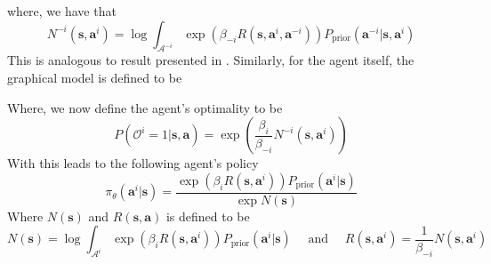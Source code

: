 where, we have that 
\begin{equation}
    N^{-i}(\boldsymbol{s}, \boldsymbol{a}^{i}) = \log \int_{\mathcal{A}^{-i}} \exp(\beta_{-i} R(\boldsymbol{s}, \boldsymbol{a}^i, \boldsymbol{a}^{-i})) P_{\text{prior}}(\boldsymbol{a}^{-i} | \boldsymbol{s}, \boldsymbol{a}^{i})
\end{equation}
This is analogous to result presented in \cite{wen2019probabilistic}. Similarly, for the agent itself, the graphical model is defined to be 
\begin{figure}[ht]
    \begin{minipage}[t]{0.5\linewidth}
    \centering
    \end{minipage}%
    \begin{minipage}[t]{0.5\linewidth}
    \end{minipage}
\end{figure}

\noindent
Where, we now define the agent's optimality to be 
\begin{equation}
    P(\mathcal{O}^i = 1 | \boldsymbol{s}, \boldsymbol{a}) = \exp\left( \frac{\beta_i}{\beta_{-i}} N^{-i}(\boldsymbol{s}, \boldsymbol{a}^{i}) \right) 
\end{equation}
With this leads to the following agent's policy 
\begin{equation}
    \pi_{\theta}(\boldsymbol{a}^{i} | \boldsymbol{s}) = \frac{\exp( \beta_i R(\boldsymbol{s}, \boldsymbol{a}^{i})) P_{\text{prior}}(\boldsymbol{a}^{i}  | \boldsymbol{s})}{\exp N(\boldsymbol{s})}
\end{equation}
Where $N(\boldsymbol{s})$ and $R(\boldsymbol{s}, \boldsymbol{a})$ is defined to be 
\begin{equation}
    N(\boldsymbol{s}) = \log \int_{\mathcal{A}^i} \exp( \beta_i R(\boldsymbol{s}, \boldsymbol{a}^{i})) P_{\text{prior}}(\boldsymbol{a}^{i}  | \boldsymbol{s}) \quad \text{ and } \quad R(\boldsymbol{s}, \boldsymbol{a}^i) = \frac{1}{\beta_{-i}} N(\boldsymbol{s}, \boldsymbol{a}^i)
\end{equation}


